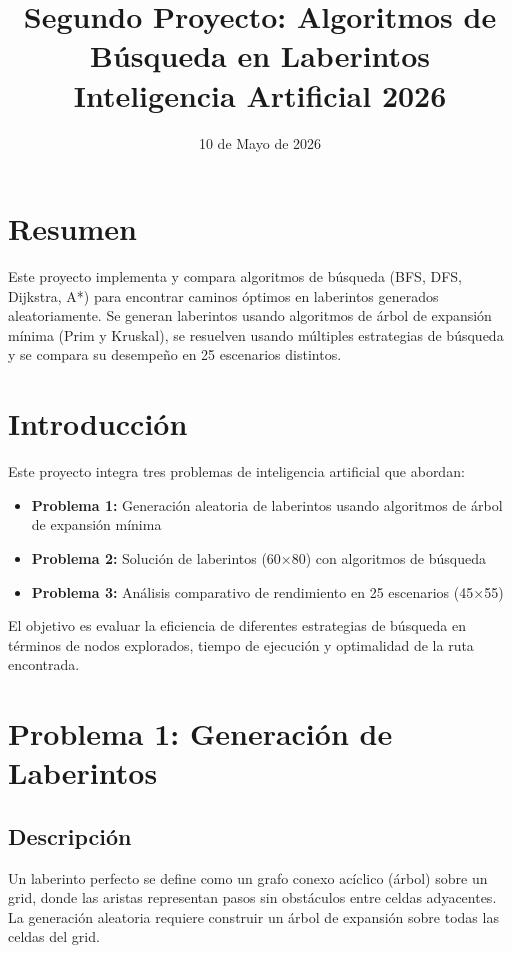 \documentclass[12pt,a4paper]{article}
\title{\textbf{Segundo Proyecto: Algoritmos de Búsqueda en Laberintos}\\
\large Inteligencia Artificial 2026}
\author{}
\date{10 de Mayo de 2026}
\begin{document}
\maketitle

\section*{Resumen}
Este proyecto implementa y compara algoritmos de búsqueda (BFS, DFS, Dijkstra, A*) para encontrar caminos óptimos en laberintos generados aleatoriamente. Se generan laberintos usando algoritmos de árbol de expansión mínima (Prim y Kruskal), se resuelven usando múltiples estrategias de búsqueda y se compara su desempeño en 25 escenarios distintos.

\newpage
\tableofcontents
\newpage

\section{Introducción}

Este proyecto integra tres problemas de inteligencia artificial que abordan:
\begin{itemize}
    \item \textbf{Problema 1:} Generación aleatoria de laberintos usando algoritmos de árbol de expansión mínima
    \item \textbf{Problema 2:} Solución de laberintos (60×80) con algoritmos de búsqueda
    \item \textbf{Problema 3:} Análisis comparativo de rendimiento en 25 escenarios (45×55)
\end{itemize}

El objetivo es evaluar la eficiencia de diferentes estrategias de búsqueda en términos de nodos explorados, tiempo de ejecución y optimalidad de la ruta encontrada.

\section{Problema 1: Generación de Laberintos}

\subsection{Descripción}

Un laberinto perfecto se define como un grafo conexo acíclico (árbol) sobre un grid, donde las aristas representan pasos sin obstáculos entre celdas adyacentes. La generación aleatoria requiere construir un árbol de expansión sobre todas las celdas del grid.
\end{document}
